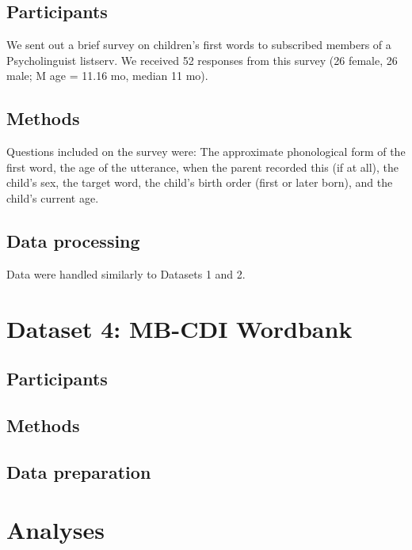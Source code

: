 \documentclass[10pt,letterpaper]{article}
\begin{document}
\subsection{Participants}
We sent out a brief survey on children's first words to subscribed members of a Psycholinguist listserv. We received 52 responses from this survey (26 female, 26 male; M age = 11.16 mo, median 11 mo).

\subsection{Methods}
Questions included on the survey were: The approximate phonological form of the  first word, the age of the utterance, when the parent recorded this (if at all), the child’s sex, the target word, the child’s birth order (first or later born), and the child’s current age. 

 \subsection{Data processing}
Data were handled similarly to Datasets 1 and 2. 

\section{Dataset 4: MB-CDI Wordbank}

\subsection{Participants}

\subsection{Methods}

\subsection{Data preparation}

\section{Analyses}
\end{document}
